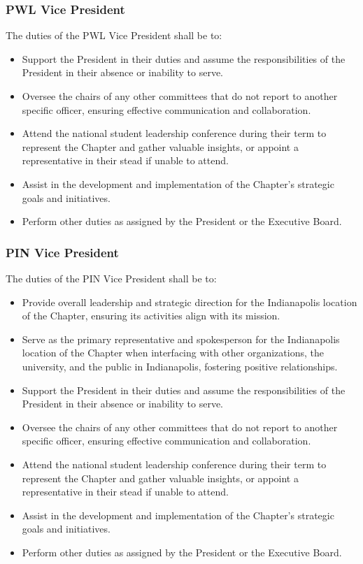 \documentclass[10pt, oneside]{article}
\begin{document}
\subsubsection{PWL Vice President}
The duties of the PWL Vice President shall be to:
\begin{itemize}
    \item Support the President in their duties and assume the responsibilities of the President in their absence or inability to serve.
    \item Oversee the chairs of any other committees that do not report to another specific officer, ensuring effective communication and collaboration.
    \item Attend the national student leadership conference during their term to represent the Chapter and gather valuable insights, or appoint a representative in their stead if unable to attend.
    \item Assist in the development and implementation of the Chapter's strategic goals and initiatives.
    \item Perform other duties as assigned by the President or the Executive Board.
\end{itemize}
\subsubsection{PIN Vice President}
The duties of the PIN Vice President shall be to:
\begin{itemize}
	\item Provide overall leadership and strategic direction for the Indianapolis location of the Chapter, ensuring its activities align with its mission.
	\item Serve as the primary representative and spokesperson for the Indianapolis location of the Chapter when interfacing with other organizations, the university, and the public in Indianapolis, fostering positive relationships.
    \item Support the President in their duties and assume the responsibilities of the President in their absence or inability to serve.
    \item Oversee the chairs of any other committees that do not report to another specific officer, ensuring effective communication and collaboration.
    \item Attend the national student leadership conference during their term to represent the Chapter and gather valuable insights, or appoint a representative in their stead if unable to attend.
    \item Assist in the development and implementation of the Chapter's strategic goals and initiatives.
    \item Perform other duties as assigned by the President or the Executive Board.
\end{itemize}
\end{document}
